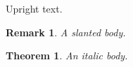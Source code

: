 \documentclass{article}
\theoremstyle{mine}
\newtheorem{rem}{Remark}
\theoremstyle{plain}
\newtheorem{thm}{Theorem}
\begin{document}
Upright text.
\begin{rem}A slanted body.\end{rem}
\begin{thm}An italic body.\end{thm}
\end{document}
